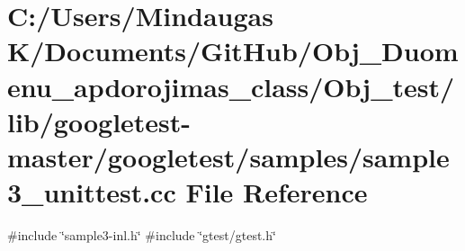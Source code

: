 \hypertarget{_obj__test_2lib_2googletest-master_2googletest_2samples_2sample3__unittest_8cc}{}\section{C\+:/\+Users/\+Mindaugas K/\+Documents/\+Git\+Hub/\+Obj\+\_\+\+Duomenu\+\_\+apdorojimas\+\_\+class/\+Obj\+\_\+test/lib/googletest-\/master/googletest/samples/sample3\+\_\+unittest.cc File Reference}
\label{_obj__test_2lib_2googletest-master_2googletest_2samples_2sample3__unittest_8cc}
{\ttfamily \#include \char`\"{}sample3-\/inl.\+h\char`\"{}}\newline
{\ttfamily \#include \char`\"{}gtest/gtest.\+h\char`\"{}}\newline

